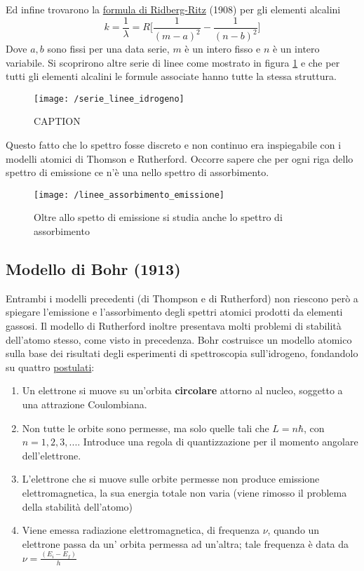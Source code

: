 Ed infine trovarono la \underline{formula di Ridberg-Ritz} (1908) per gli elementi alcalini
\begin{equation}
k = \frac{1}{\lambda} = R \biggl[ \frac{1}{(m-a)^2} - \frac{1}{(n-b)^2}  \biggr]
\end{equation}
Dove $a, b$ sono fissi per una data serie, $m$ è un intero fisso e $n$ è un intero variabile.
Si scoprirono altre serie di linee come mostrato in figura \ref{serie_linee} e che per tutti gli elementi alcalini le formule associate hanno tutte la stessa struttura.
\begin{figure}[h]
\centering
\texttt{[image: /serie\_linee\_idrogeno]}
\caption{CAPTION}
\label{serie_linee}
\end{figure}
Questo fatto che lo spettro fosse discreto e non continuo era inspiegabile con i modelli atomici di Thomson e Rutherford. 
Occorre sapere che per ogni riga dello spettro di emissione ce n'è una nello spettro di assorbimento.
\begin{figure}[h]
\centering
\texttt{[image: /linee\_assorbimento\_emissione]}
\caption{Oltre allo spetto di emissione si studia anche lo spettro di assorbimento}
\end{figure}


\subsection{Modello di Bohr (1913)}
Entrambi i modelli precedenti (di Thompson e di Rutherford) non riescono però a spiegare l'emissione e l'assorbimento degli spettri atomici prodotti da elementi gassosi.
Il modello di Rutherford inoltre presentava molti problemi di stabilità dell'atomo stesso, come visto in precedenza.
Bohr costruisce un modello atomico sulla base dei risultati degli esperimenti di spettroscopia sull'idrogeno, fondandolo su quattro \underline{postulati}:
\begin{enumerate}
\item Un elettrone si muove su un'orbita \textbf{circolare} attorno al nucleo, soggetto a una attrazione Coulombiana.
\item Non tutte le orbite sono permesse, ma solo quelle tali che $L=n\hbar$, con $n=1, 2, 3, ... $. Introduce una regola di quantizzazione per il momento angolare dell'elettrone.
\item L'elettrone che si muove sulle orbite permesse non produce emissione elettromagnetica, la sua energia totale non varia (viene rimosso il problema della stabilità dell'atomo)
\item Viene emessa radiazione elettromagnetica, di frequenza $\nu$, quando un elettrone passa da un' orbita permessa ad un'altra; tale frequenza è data da $ \nu = \frac{(E_i - E_f)}{h}$
\end{enumerate}

